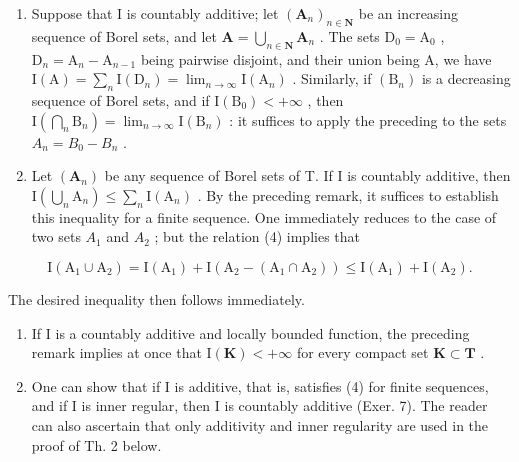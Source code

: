 \begin{enumerate}
\def\labelenumi{\arabic{enumi})}
\setcounter{enumi}{1}
\item
  Suppose that I is countably additive; let \((\mathbf{A}_n)_{n\in \mathbf{N}}\) be an increasing sequence of Borel sets, and let \(\mathbf{A} = \bigcup_{n\in \mathbf{N}}\mathbf{A}_n\) . The sets \(\mathrm{D}_0 = \mathrm{A}_0\) , \(\mathrm{D}_n = \mathrm{A}_n - \mathrm{A}_{n - 1}\) being pairwise disjoint, and their union being A, we have \(\mathrm{I}(\mathrm{A}) = \sum_{n} \mathrm{I}(\mathrm{D}_{n}) = \lim_{n \to \infty} \mathrm{I}(\mathrm{A}_{n})\) . Similarly, if \((\mathrm{B}_{n})\) is a decreasing sequence of Borel sets, and if \(\mathrm{I}(\mathrm{B}_{0}) < +\infty\) , then \(\mathrm{I}\left(\bigcap_{n} \mathrm{B}_{n}\right) = \lim_{n \to \infty} \mathrm{I}(\mathrm{B}_{n})\) : it suffices to apply the preceding to the sets \(A_{n} = B_{0} - B_{n}\) .
\item
  Let \((\mathbf{A}_n)\) be any sequence of Borel sets of T. If I is countably additive, then \(\mathrm{I}\left(\bigcup_{n} \mathrm{A}_n\right) \leqslant \sum_{n} \mathrm{I}(\mathrm{A}_n)\) . By the preceding remark, it suffices to establish this inequality for a finite sequence. One immediately reduces to the case of two sets \(A_{1}\) and \(A_{2}\) ; but the relation (4) implies that
\end{enumerate}

\[
\mathrm{I} \left(\mathrm{A} _ {1} \cup \mathrm{A} _ {2}\right) = \mathrm{I} \left(\mathrm{A} _ {1}\right) + \mathrm{I} \left(\mathrm{A} _ {2} - \left(\mathrm{A} _ {1} \cap \mathrm{A} _ {2}\right)\right) \leqslant \mathrm{I} \left(\mathrm{A} _ {1}\right) + \mathrm{I} \left(\mathrm{A} _ {2}\right).
\]

The desired inequality then follows immediately.

\begin{enumerate}
\def\labelenumi{\arabic{enumi})}
\setcounter{enumi}{3}
\item
  If I is a countably additive and locally bounded function, the preceding remark implies at once that \(\mathrm{I}(\mathbf{K}) < +\infty\) for every compact set \(\mathbf{K} \subset \mathbf{T}\) .
\item
  One can show that if I is additive, that is, satisfies (4) for finite sequences, and if I is inner regular, then I is countably additive (Exer. 7). The reader can also ascertain that only additivity and inner regularity are used in the proof of Th. 2 below.
\end{enumerate}

